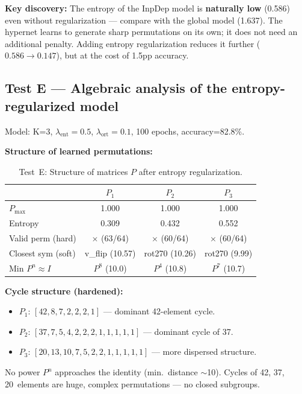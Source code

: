 \documentclass[11pt,a4paper]{report}
\begin{document}
\textbf{Key discovery:} The entropy of the InpDep model is \textbf{naturally low} (0.586) even without regularization --- compare with the global model (1.637). The hypernet learns to generate sharp permutations on its own; it does not need an additional penalty. Adding entropy regularization reduces it further ($0.586 \to 0.147$), but at the cost of 1.5pp accuracy.


\subsection{Test E --- Algebraic analysis of the entropy-regularized model}

Model: K=3, $\lambda_{\text{ent}}=0.5$, $\lambda_{\text{ort}}=0.1$, 100 epochs, accuracy=82.8\%.

\textbf{Structure of learned permutations:}

\begin{table}[h]
\centering
\caption{Test~E: Structure of matrices $P$ after entropy regularization.}
\begin{tabular}{lccc}
\hline
 & $P_1$ & $P_2$ & $P_3$ \\
\hline
$P_{\max}$ & 1.000 & 1.000 & 1.000 \\
Entropy & 0.309 & 0.432 & 0.552 \\
Valid perm (hard) & $\times$ (63/64) & $\times$ (60/64) & $\times$ (60/64) \\
Closest sym (soft) & v\_flip (10.57) & rot270 (10.26) & rot270 (9.99) \\
Min $P^n \approx I$ & $P^8$ (10.0) & $P^4$ (10.8) & $P^7$ (10.7) \\
\hline
\end{tabular}
\end{table}

\textbf{Cycle structure (hardened):}
\begin{itemize}
    \item $P_1$: $[42, 8, 7, 2, 2, 2, 1]$ --- dominant 42-element cycle.
    \item $P_2$: $[37, 7, 5, 4, 2, 2, 2, 1, 1, 1, 1, 1]$ --- dominant cycle of 37.
    \item $P_3$: $[20, 13, 10, 7, 5, 2, 2, 1, 1, 1, 1, 1]$ --- more dispersed structure.
\end{itemize}

No power $P^n$ approaches the identity (min.\ distance $\sim$10). Cycles of 42, 37, 20~elements are huge, complex permutations --- no closed subgroups.
\end{document}
